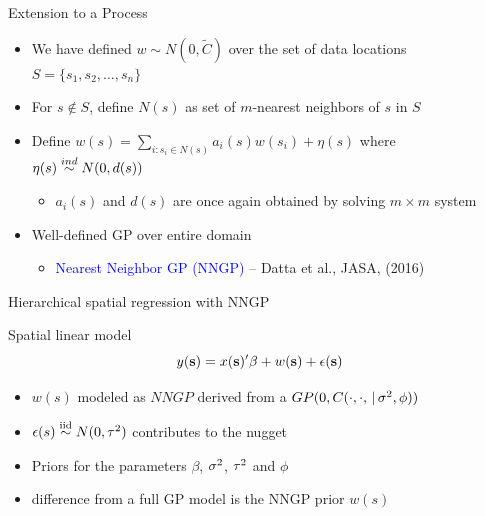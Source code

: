 \begin{frame}{Extension to a Process} %
	\begin{itemize}\setlength{\itemsep}{1cm}
		\item We have defined $w \sim N(0, \tilde C)$ over the set of data locations $S=\{s_1, s_2, \ldots, s_n\}$
		\item For $s \notin S$, define $N(s)$ as set of $m$-nearest neighbors of $s$ in $S$
		\item Define $w(s) = \sum_{i:s_i \in N(s)} a_i(s)w(s_i) + \eta(s)$ where $\eta(s) \overset{ind}{\sim} N(0,d(s))$ 
		\begin{itemize}
			\item $a_i(s)$ and $d(s)$ are once again obtained by solving $m \times m$ system
		\end{itemize}
		\item Well-defined GP over entire domain
		\begin{itemize}
			\item \textcolor{blue}{Nearest Neighbor GP (NNGP)} -- Datta et al., JASA, (2016)
		\end{itemize}
	\end{itemize}
\end{frame}

\begin{frame}{Hierarchical spatial regression with NNGP}
	\begin{alertblock}{Spatial linear model}
	\[y(\textbf{s})=x(\textbf{s})'\beta + w(\textbf{s}) + \epsilon(\textbf{s})\]
\end{alertblock}
\begin{itemize}
\item $w(s)$ modeled as $NNGP$ derived from a $GP(0, C(\cdot, \cdot, \,|\, \sigma^2, \phi))$
\item $\epsilon(s) \stackrel{\mathrm{iid}}{\sim} N(0,\tau^2)$ contributes to the nugget
\item Priors for the parameters $\beta$, $\sigma^2$, $\tau^2$ and $\phi$
\item {} difference from a full GP model is the NNGP prior $w(s)$
\end{itemize}
\end{frame}


